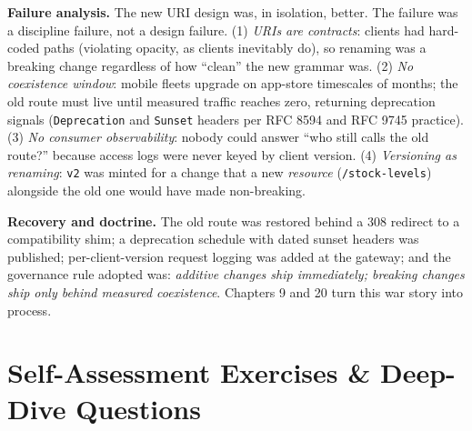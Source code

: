 \textbf{Failure analysis.} The new URI design was, in isolation, better. The
failure was a discipline failure, not a design failure. (1) \emph{URIs are
contracts}: clients had hard-coded paths (violating opacity, as clients
inevitably do), so renaming was a breaking change regardless of how ``clean''
the new grammar was. (2) \emph{No coexistence window}: mobile fleets upgrade on
app-store timescales of months; the old route must live until measured traffic
reaches zero, returning deprecation signals (\texttt{Deprecation} and
\texttt{Sunset} headers per RFC 8594 and RFC 9745 practice). (3) \emph{No
consumer observability}: nobody could answer ``who still calls the old route?''
because access logs were never keyed by client version. (4) \emph{Versioning as
renaming}: \texttt{v2} was minted for a change that a new \emph{resource}
(\texttt{/stock-levels}) alongside the old one would have made non-breaking.

\textbf{Recovery and doctrine.} The old route was restored behind a 308 redirect
to a compatibility shim; a deprecation schedule with dated sunset headers was
published; per-client-version request logging was added at the gateway; and the
governance rule adopted was: \emph{additive changes ship immediately; breaking
changes ship only behind measured coexistence}. Chapters 9 and 20 turn this war
story into process.

\section{Self-Assessment Exercises \& Deep-Dive Questions}
\label{sec:ch3-assessment}


